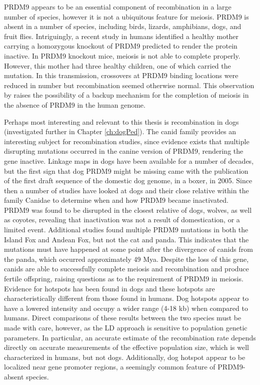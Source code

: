 PRDM9 appears to be an essential component of recombination in a large number of species, however it is not a ubiquitous feature for meiosis.
PRDM9 is absent in a number of species, including birds, lizards, amphibians, dogs, and fruit flies\cite{Ponting2011,Oliver2009}.
Intriguingly, a recent study in humans identified a healthy mother carrying a homozygous knockout of PRDM9 predicted to render the protein inactive\cite{Narasimhan2016}.
In PRDM9 knockout mice, meiosis is not able to complete properly\cite{Brick2012}.
However, this mother had three healthy children, one of which carried the mutation.
In this transmission, crossovers at PRDM9 binding locations were reduced in number but recombination seemed otherwise normal.
This observation by \citet{Narasimhan2016} raises the possibility of a backup mechanism for the completion of meiosis in the absence of PRDM9 in the human genome.


Perhaps most interesting and relevant to this thesis is recombination in dogs (investigated further in Chapter \ref{ch:dogPed}). %
The canid family provides an interesting subject for recombination studies, since evidence exists that multiple disrupting mutations occurred in the canine version of PRDM9, rendering the gene inactive.
Linkage maps in dogs have been available for a number of decades\cite{Mellersh1997,Neff1999}, but
the first sign that dog PRDM9 might be missing came with the publication of the first draft sequence of the domestic dog genome, in a boxer, in 2005\cite{Lindblad-Toh2005}.
Since then a number of studies have looked at dogs and their close relative within the family Canidae to determine when and how PRDM9 became inactivated.
PRDM9 was found to be disrupted in the closest relative of dogs, wolves, as well as coyotes\cite{Munoz-Fuentes2011}, revealing that inactivation was not a result of domestication, or a limited event.
Additional studies found multiple PRDM9 mutations in both the Island Fox and Andean Fox\cite{Auton2013}, but not the cat and panda\cite{Axelsson2012}.
This indicates that the mutations must have happened at some point after the divergence of canids from the panda, which occurred approximately 49 Mya\cite{Oliver2009,Axelsson2012}.
Despite the loss of this gene, canids are able to successfully complete meiosis and recombination and produce fertile offspring, raising questions as to the requirement of PRDM9 in meiosis.
Evidence for hotspots has been found in dogs and these hotspots are characteristically different from those found in humans.
Dog hotspots appear to have a lowered intensity and occupy a wider range (4-18 kb)\cite{Axelsson2012,Auton2013} when compared to humans.
Direct comparisons of these results between the two species must be made with care, however, as the LD approach is sensitive to population genetic parameters.
In particular, an accurate estimate of the recombination rate depends directly on accurate measurements of the effective population size, which is well characterized in humans, but not dogs.
Additionally, dog hotspot appear to be localized near gene promoter regions\cite{Auton2013}, a seemingly common feature of PRDM9-absent species.

